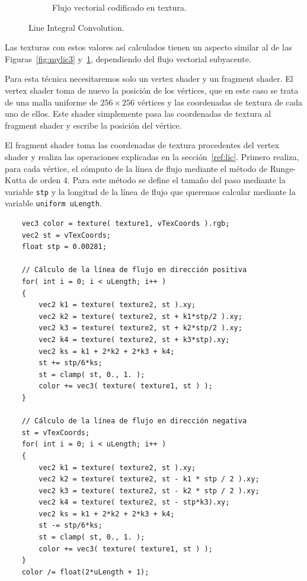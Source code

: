 \begin{figure}
\begin{subfigure}{0.45\textwidth}
		\caption{Flujo vectorial codificado en textura.}
		\label{fig:mylic4}
	\end{subfigure}
	\caption{Line Integral Convolution.}
	\label{fig:mylic}
\end{figure}

Las texturas con estos valores así calculados tienen un aspecto similar al de las
Figuras~\ref{fig:mylic3} y~\ref{fig:mylic4}, dependiendo del flujo vectorial
subyacente.

Para esta técnica necesitaremos solo un vertex shader y un fragment shader. El
vertex shader toma de nuevo la posición de los vértices, que en este caso se
trata de una malla uniforme de $256\times 256$ vértices y las coordenadas de
textura de cada uno de ellos. Este shader simplemente pasa las coordenadas de
textura al fragment shader y escribe la posición del vértice. 

El fragment shader toma las coordenadas de textura procedentes del vertex shader
y realiza las operaciones explicadas en la sección~\ref{ref:lic}. Primero
realiza, para cada vértice, el cómputo de la línea de flujo mediante el método
de Runge-Kutta de orden 4. Para este método se define el tamaño del paso
mediante la variable \verb|stp| y la longitud de la línea de flujo que queremos
calcular mediante la variable \verb|uniform uLength|.

\begin{verbatim}
    vec3 color = texture( texture1, vTexCoords ).rgb;
    vec2 st = vTexCoords;
    float stp = 0.00281;

    // Cálculo de la línea de flujo en dirección positiva
    for( int i = 0; i < uLength; i++ )
    {
        vec2 k1 = texture( texture2, st ).xy;
        vec2 k2 = texture( texture2, st + k1*stp/2 ).xy;
        vec2 k3 = texture( texture2, st + k2*stp/2 ).xy;
        vec2 k4 = texture( texture2, st + k3*stp).xy;
        vec2 ks = k1 + 2*k2 + 2*k3 + k4;
        st += stp/6*ks;
        st = clamp( st, 0., 1. );
        color += vec3( texture( texture1, st ) );
    }

    // Cálculo de la línea de flujo en dirección negativa
    st = vTexCoords;
    for( int i = 0; i < uLength; i++ )
    {
        vec2 k1 = texture( texture2, st ).xy;
        vec2 k2 = texture( texture2, st - k1 * stp / 2 ).xy;
        vec2 k3 = texture( texture2, st - k2 * stp / 2 ).xy;
        vec2 k4 = texture( texture2, st - stp*k3).xy;
        vec2 ks = k1 + 2*k2 + 2*k3 + k4;
        st -= stp/6*ks;
        st = clamp( st, 0., 1. );
        color += vec3( texture( texture1, st ) );
    }
    color /= float(2*uLength + 1); 
\end{verbatim}

